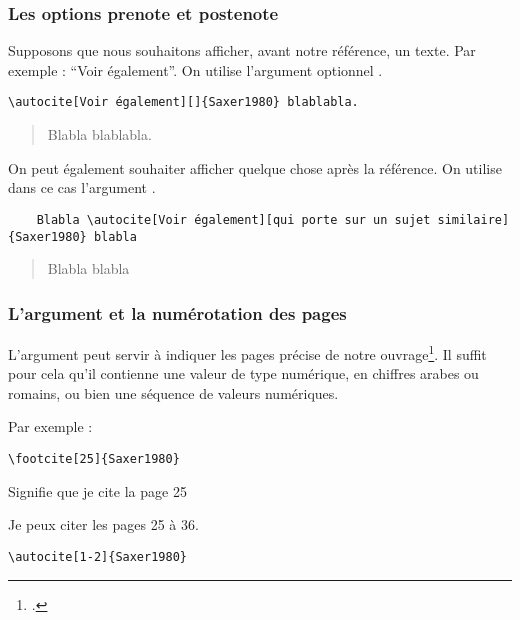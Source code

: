 \subsubsection{Les options prenote et postenote}

Supposons que nous souhaitons afficher, avant notre référence, un texte. Par exemple : \enquote{Voir également}. On utilise l'argument optionnel .

\begin{verbatim}
\autocite[Voir également][]{Saxer1980} blablabla.
\end{verbatim}

\begin{quotation}
Blabla \parencite[Voir également][]{Saxer1980} blablabla.
\end{quotation}



On peut également souhaiter afficher quelque chose après la référence. On utilise dans ce cas l'argument .

\begin{verbatim}
	Blabla \autocite[Voir également][qui porte sur un sujet similaire]{Saxer1980} blabla
\end{verbatim}

\begin{quotation}

	Blabla \parencite[Voir également][qui porte sur un sujet similaire]{Saxer1980} blabla
\end{quotation}

\subsubsection{L'argument  et la numérotation des pages}

L'argument  peut servir à indiquer les pages précise de notre ouvrage\footcite[On consultera pour plus de détails : ][]{biblatex_pages}. Il suffit pour cela qu'il contienne une valeur de type numérique, en chiffres arabes ou romains, ou bien une séquence de valeurs numériques.

Par exemple : 
\begin{verbatim}
\footcite[25]{Saxer1980}
\end{verbatim}

Signifie que je cite la page 25

Je peux citer les pages 25 à 36.

\begin{verbatim}
\autocite[1-2]{Saxer1980}
\end{verbatim}

